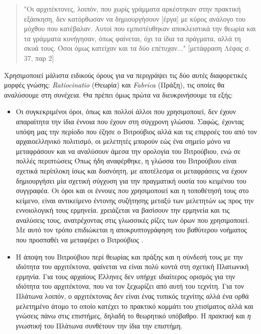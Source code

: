 \begin{quote}
"Οι αρχιτέκτονες, λοιπόν, που χωρίς γράμματα αρκέστηκαν στην πρακτική εξάσκηση,  δεν κατόρθωσαν να δημιουργήσουν [έργα] με κύρος ανάλογο του μόχθου που κατέβαλαν. Αυτοί που εμπιστέυθηκαν αποκλειστικά την θεωρία και τα γράμματα κυνήγησαν, όπως φαίνεται, όχι τα ίδια τα πράγματα, αλλά τη σκυά τους. Όσοι όμως κατείχαν και τα δύο επέτυχαν..." [μετάφραση Λέφας σ. 37, παρ 2]
\end{quote}

Χρησιμοποιεί μάλιστα ειδικούς όρους για να περιγράψει τις δύο αυτές διαφορετικές μορφές γνώσης: \emph{Ratiocinatio} (Θεωρία) και \emph{Fabrica} (Πράξη), τις οποίες θα αναλύσουμε στη συνέχεια. Θα πρέπει όμως πρώτα να διευκρινήσουμε τα εξής:

\begin{itemize}
\item Οι συγκεκριμένοι όροι, όπως και πολλοί άλλοι που χρησιμοποιεί, δεν έχουν απαραίτητα την ίδια έννοια που έχουν στη σύγχρονη γλώσσα. Σαφώς, έχοντας υπόψη μας την περίοδο που έζησε ο Βιτρούβιος αλλά και τις επιρροές του από τον αρχαιοελληνικό πολιτισμό, οι μελετητές μπορούν εώς ένα σημείο μόνο να μεταφράσουν και να αναλύσουν άμεσα την ορολογία του Βιτρούβιου, ενώ σε πολλές περιπτώσεις \sidenote%
    {Όπως ήδη αναφέρθηκε, η γλώσσα του Βιτρούβιου είναι σχετικά περίπλοκη ίσως και δυσνόητη, με αποτέλεσμα οι μεταφράσεις να έχουν δημιουργήσει μία σχετική σύγχυση για την πραγματική ουσία του κειμένου του συγγραφέα. Οι όροι και οι έννοιες που χρησιμοποιεί και η τοποθέτησή τους στο κείμενο, είναι αντικείμενο έντονης συζήτησης μεταξύ των μελετητών ως προς την εννοιολογική τους ερμηνεία.}
χρειάζεται να βασίσουν την ερμηνεία και τις αναλύσεις τους, ανατρέχοντας στις γλωσσικές ρίζες των όρων που χρησιμοποιεί. Με αυτό τον τρόπο επιδιώκεται η αποκρυπτογράφηση του βαθύτερου νοήματος που προσπαθέι να μεταφέρει ο Βιτρούβιος \cite{graham-education}.
\item Η άποψη του Βιτρούβιου περί θεωρίας και πράξης και η σύνδεσή τους με την ιδιότητα του αρχιτέκτονα, φαίνεται να είναι πολύ κοντά στη σχετική Πλατωνική ερμηνία. Για τους αρχαίους Έλληνες δεν υπήρχε ιδιαίτερος ορισμός για την ιδιότητα του αρχιτέκτονα, που να τον ξεχωρίζει από αυτή του τεχνίτη. Για τον Πλάτωνα λοιπόν, ο αρχιτέκτονας δεν είναι ένας τυπικός τεχνίτης αλλά ένα ορθά μελετημένο άτομο το οποίο κατέχει το πρακτικό κομμάτι του χτισίματος αλλά και γνώσεις πάνω στις επιστήμες, δηλαδή το θεωρητικό υπόβαθρο. Η \emph{πρακτική} και \emph{η γνωστική} του Πλάτωνα συνθέτουν την ίδια την επιστήμη. \cite{graham-education}
\end{itemize}

